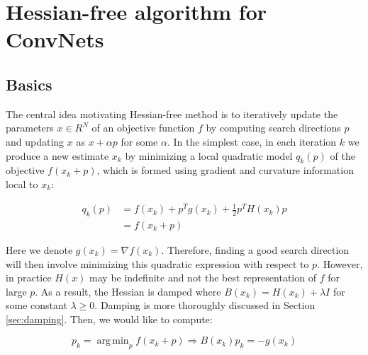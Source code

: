 \documentclass[10pt,twocolumn,letterpaper]{article}
\DeclareMathOperator*{\argmin}{arg\,min}
\begin{document}
\section{Hessian-free algorithm for ConvNets}
\subsection{Basics}
\label{sec:basics}
The central idea motivating Hessian-free method is to iteratively update the parameters $x \in R^N$ of an objective function $f$ by computing search directions $p$ and updating $x$ as $x + \alpha  p$ for some $\alpha$. In the simplest case, in each iteration $k$ we produce a new estimate $x_k$ by minimizing a local quadratic model $q_k(p)$ of the objective $f(x_k+p)$, which is formed using gradient and curvature information local to $x_k$:

\begin{equation}
\label{eq:quadratic}
\begin{split}
q_k(p) & =  f(x_k) + p^T g(x_k) + \frac{1}{2} p^T H(x_k)p \\
  &  = f(x_k +p)
\end{split}
\end{equation}

Here we denote $g(x_k) = \nabla f(x_k)$. Therefore, finding a good search direction will then involve minimizing this quadratic expression with respect to $p$. However, in practice $H(x)$ may be indefinite and not the best representation of $f$ for large $p$. As a result, the Hessian is damped where $B(x_k) = H(x_k) + \lambda I$ for some constant $\lambda \geq 0$. Damping is more thoroughly discussed in Section \ref{sec:damping}. Then, we would like to compute:



\begin{equation}
\label{eq:quadratic_optim}
 p_k =  \argmin_p f(x_k + p) \Rightarrow B(x_k) p_k = -g(x_k)
\end{equation}
\end{document}
